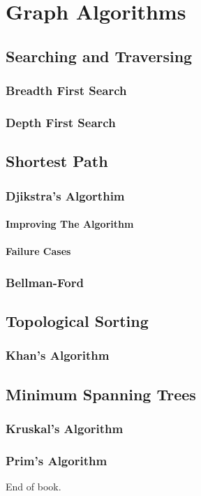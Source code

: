 \chapter{Graph Algorithms}

\section{Searching and Traversing}

\subsection{Breadth First Search}

\subsection{Depth First Search}




\section{Shortest Path}

\subsection{Djikstra's Algorthim}

\subsubsection{Improving The Algorithm}

\subsubsection{Failure Cases}


\subsection{Bellman-Ford}



\section{Topological Sorting}

\subsection{Khan's Algorithm}

\section{Minimum Spanning Trees}


\subsection{Kruskal's Algorithm}
\subsection{Prim's Algorithm }

End of book.